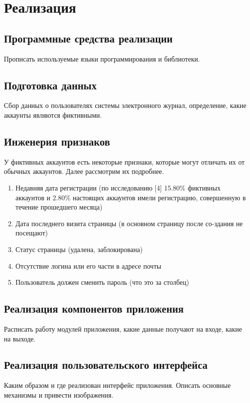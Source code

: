 \lstset{language=C, frame=L, basicstyle=\footnotesize,%
	keywordstyle=\bfseries, showstringspaces=false, xleftmargin=\parindent, numbers=none, numberstyle=\tiny, stepnumber=2, numbersep=5pt}
\newpage
\section{Реализация}
\label{sec:Realisation}
\subsection{Программные средства реализации}
\label{subsec:Recourses}
Прописать используемые языки программирования и библиотеки.

\vspace{1.5em}
\subsection{Подготовка данных}
\label{subsec:Preparation}
Сбор данных о пользователях системы электронного журнал, определение, какие аккаунты являются фиктивными.

\vspace{1.5em}
\subsection{Инженерия признаков}
\label{subsec:Characteristics}
У фиктивных аккаунтов есть некоторые признаки, которые могут отличать их от обычных аккаунтов. Далее рассмотрим их подробнее.
\begin{enumerate}
    \item Недавняя дата регистрации (по исследованию [4] 15.80\% фиктивных аккаунтов и 2.80\% настоящих аккаунтов имели регистрацию, совершенную в течение прошедшего месяца)
    \item Дата последнего визита страницы (в основном страницу после со-здания не посещают)
    \item Статус страницы (удалена, заблокирована)
    \item Отсутствие логина или его части в адресе почты
    \item Пользователь должен сменить пароль (что это за столбец)
\end{enumerate}

\vspace{1.5em}
\subsection{Реализация компонентов приложения}
\label{subsec:Components}
Расписать работу модулей приложения, какие данные получают на входе, какие на выходе.

\vspace{1.5em}
\subsection{Реализация пользовательского интерфейса}
\label{subsec:UserInt}
Каким образом и где реализован интерфейс приложения. Описать основные механизмы и привести изображения.